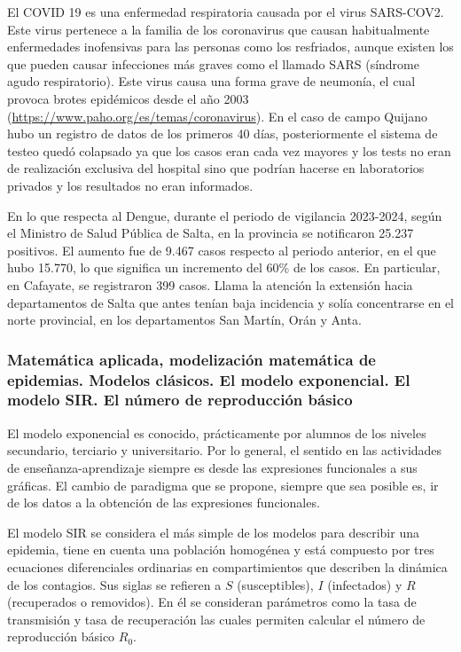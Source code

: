 El COVID 19 es una enfermedad respiratoria causada por el virus SARS-COV2. Este virus pertenece a la familia de los coronavirus que causan habitualmente enfermedades inofensivas para las personas como los resfriados, aunque existen los que pueden causar infecciones más graves como el llamado SARS (síndrome agudo respiratorio). Este virus causa una forma grave de neumonía, el cual provoca brotes epidémicos desde el año 2003 (\url{https://www.paho.org/es/temas/coronavirus}). En el caso de campo Quijano hubo un registro de datos de los primeros 40 días, posteriormente el sistema de testeo quedó colapsado ya que los casos eran cada vez mayores y los tests no eran de realización exclusiva del hospital sino que podrían hacerse en laboratorios privados y los resultados no eran informados.

En lo que respecta al Dengue, durante el periodo de vigilancia 2023-2024, según el Ministro de Salud Pública de Salta, en la provincia se notificaron 25.237 positivos. El aumento fue de 9.467 casos respecto al periodo anterior, en el que hubo 15.770, lo que significa un incremento del 60\% de los casos. En particular, en Cafayate, se registraron 399 casos. Llama la atención la extensión hacia departamentos de Salta que antes tenían baja incidencia y solía concentrarse en el norte provincial, en los departamentos San Martín, Orán y Anta.

\subsubsection{Matemática aplicada, modelización matemática de epidemias. Modelos clásicos. El modelo exponencial. El modelo SIR. El número de reproducción básico}

El modelo exponencial es conocido, prácticamente por alumnos de los niveles secundario, terciario y universitario. Por lo general, el sentido en las actividades de enseñanza-aprendizaje siempre es desde las expresiones funcionales a sus gráficas. El cambio de paradigma que se propone, siempre que sea posible es, ir de los datos a la obtención de las expresiones funcionales.

El modelo SIR se considera el más simple de los modelos para describir una epidemia, tiene en cuenta una población homogénea y está compuesto por tres ecuaciones diferenciales ordinarias en compartimientos que describen la dinámica de los contagios. Sus siglas se refieren a $S$ (susceptibles), $I$ (infectados) y $R$ (recuperados o removidos). En él se consideran parámetros como la tasa de transmisión y tasa de recuperación las cuales permiten calcular el número de reproducción básico $R_0$.

